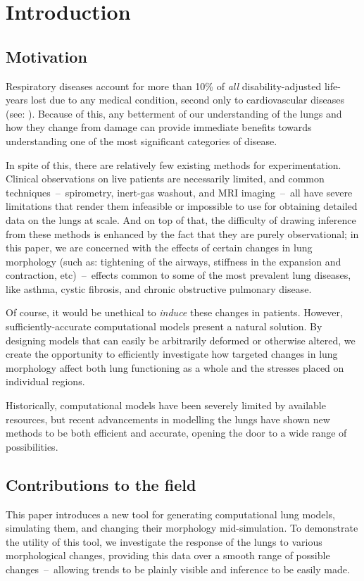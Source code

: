 %
\section{Introduction}

\subsection{Motivation} \label{sec:motivation}

Respiratory diseases account for more than 10\% of \textit{all} disability-adjusted life-years lost
due to any medical condition, second only to cardiovascular diseases (see: \cite{GlobalImpact}).
Because of this, any betterment of our understanding of the lungs and how they change from damage
can provide immediate benefits towards understanding one of the most significant categories of
disease.

In spite of this, there are relatively few existing methods for experimentation. Clinical
observations on live patients are necessarily limited, and common techniques~--~spirometry,
inert-gas washout, and MRI imaging~--~all have severe limitations that render them infeasible or
impossible to use for obtaining detailed data on the lungs at scale. And on top of that, the
difficulty of drawing inference from these methods is enhanced by the fact that they are purely
observational; in this paper, we are concerned with the effects of certain changes in lung
morphology (such as: tightening of the airways, stiffness in the expansion and contraction,
etc)~--~effects common to some of the most prevalent lung diseases, like asthma, cystic fibrosis,
and chronic obstructive pulmonary disease.

Of course, it would be unethical to \textit{induce} these changes in patients. However,
sufficiently-accurate computational models present a natural solution. By designing models that can
easily be arbitrarily deformed or otherwise altered, we create the opportunity to efficiently
investigate how targeted changes in lung morphology affect both lung functioning as a whole and the
stresses placed on individual regions.

Historically, computational models have been severely limited by available resources, but recent
advancements in modelling the lungs have shown new methods to be both efficient and accurate,
opening the door to a wide range of possibilities.

\subsection{Contributions to the field} \label{sec:contributions}

This paper introduces a new tool for generating computational lung models, simulating them, and
changing their morphology mid-simulation. To demonstrate the utility of this tool, we investigate
the response of the lungs to various morphological changes, providing this data over a smooth range
of possible changes~--~allowing trends to be plainly visible and inference to be easily made.
